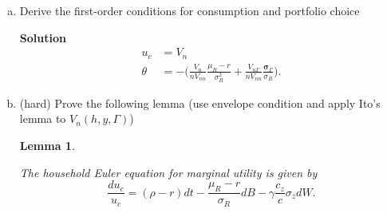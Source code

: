 \documentclass[11pt]{extarticle}
\theoremstyle{plain}
\newtheorem{lem}[thm]{Lemma}
\theoremstyle{definition}
\begin{document}
\begin{enumerate}[(a)]
\textbf{Solution:} We have 3 state variables $(n,z,\Gamma)$ and 2 controls $(c,\theta)$. The HJB with the generator is $$\rho V(n,z,\Gamma) = \max_{c,\theta} \bigg\{u(c)+\mathcal A V \bigg\}$$
Rember also that we get the generator by taking expectations after applying Ito's Lemma. We do the two steps, apply Ito's lemma to $dV$ (ignoring the dt):

\begin{align*}
	& dV = V_n  \Big[ rn + \theta n (\mu_R - r) + wz - c \Big] + \frac{1}{2} V_{nn} (\theta n \sigma_R)^2  + V_n \theta n \sigma_R dB \\
	& + V_z \mu_z + \frac{1}{2} V_{zz} \sigma_z^2 + V_{zz} \sigma_z dW +  V_\Gamma \mu_\Gamma + \frac{1}{2} \sigma_\Gamma^2 V_{\Gamma \Gamma}  +V_{\Gamma \Gamma} \sigma_\Gamma dB + V_{n\Gamma}  (\theta n \sigma_R) \sigma_\Gamma + V_{nz}  (\theta n \sigma_R) \sigma_z dWdB \\
	& + V_{z\Gamma}  \sigma_\Gamma \sigma_z dWdB
\end{align*}
Because there are 3 state variables, we also have to take into account the cross-partial derivatives (and correlations). For the term  $V_{n\Gamma}$ because $n$ and $\Gamma$ depend on the same stochastic process we have $dB dB = dt$. Taking expectations the terms with $dB$, $dB$ and $dBdW$ disappear. Substituting back into the HJB we get the result.

\item Derive the first-order conditions for consumption and portfolio choice


\textbf{Solution}
\begin{align*}
	u_c &= V_n \\
	\theta  &= - \bigg( \frac{V_n}{n V_{nn} } \frac{\mu_R - r}{\sigma_R^2 } + \frac{V_{n \Gamma} }{n V_{nn} } \frac{ \bm \sigma_\Gamma }{\sigma_R} \bigg).
\end{align*}


\item (hard) Prove the following lemma (use envelope condition and apply Ito's lemma to $V_n(h,y,\Gamma)$)

\begin{lem}\label{lem:MUEuler}
	
	The household Euler equation for marginal utility is given by
	\begin{equation*}
		\frac{d u_c}{u_c} = (\rho - r) dt -  \frac{\mu_R - r}{\sigma_R} dB  - \gamma \frac{c_z}{c} \sigma_z dW .
	\end{equation*}
	
\end{lem}


\end{enumerate}
\end{document}
